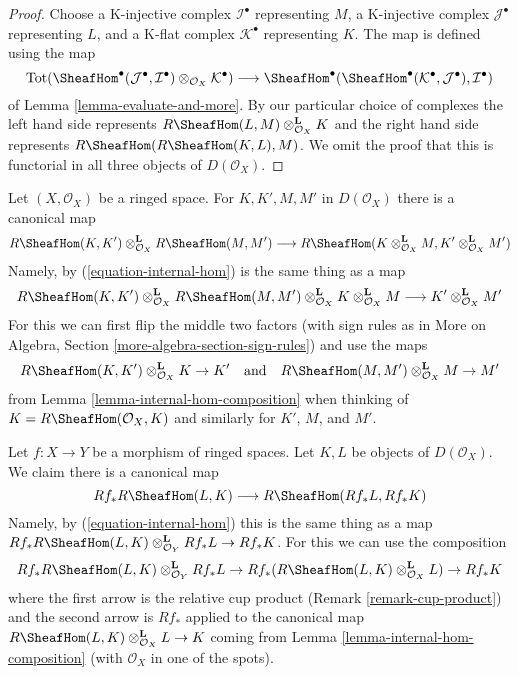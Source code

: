 \begin{proof}
Choose
a K-injective complex $\mathcal{I}^\bullet$ representing $M$,
a K-injective complex $\mathcal{J}^\bullet$ representing $L$, and
a K-flat complex $\mathcal{K}^\bullet$ representing $K$.
The map is defined using the map
$$
\text{Tot}(\SheafHom^\bullet(\mathcal{J}^\bullet,
\mathcal{I}^\bullet) \otimes_{\mathcal{O}_X} \mathcal{K}^\bullet)
\longrightarrow
\SheafHom^\bullet(\SheafHom^\bullet(\mathcal{K}^\bullet,
\mathcal{J}^\bullet), \mathcal{I}^\bullet)
$$
of Lemma \ref{lemma-evaluate-and-more}. By our particular
choice of complexes the left hand side represents
$R\SheafHom(L, M) \otimes_{\mathcal{O}_X}^\mathbf{L} K$
and the right hand side represents
$R\SheafHom(R\SheafHom(K, L), M)$. We omit the proof that
this is functorial in all three objects of $D(\mathcal{O}_X)$.
\end{proof}

\begin{remark}
\label{remark-tensor-internal-hom}
Let $(X, \mathcal{O}_X)$ be a ringed space. For $K, K', M, M'$ in
$D(\mathcal{O}_X)$ there is a canonical map
$$
R\SheafHom(K, K') \otimes_{\mathcal{O}_X}^\mathbf{L}
R\SheafHom(M, M')
\longrightarrow
R\SheafHom(K \otimes_{\mathcal{O}_X}^\mathbf{L} M,
K' \otimes_{\mathcal{O}_X}^\mathbf{L} M')
$$
Namely, by (\ref{equation-internal-hom}) is the same thing as a map
$$
R\SheafHom(K, K') \otimes_{\mathcal{O}_X}^\mathbf{L}
R\SheafHom(M, M') \otimes_{\mathcal{O}_X}^\mathbf{L}
K \otimes_{\mathcal{O}_X}^\mathbf{L} M
\longrightarrow
K' \otimes_{\mathcal{O}_X}^\mathbf{L} M'
$$
For this we can first flip the middle two factors
(with sign rules as in More on Algebra, Section
\ref{more-algebra-section-sign-rules})
and use the maps
$$
R\SheafHom(K, K') \otimes_{\mathcal{O}_X}^\mathbf{L} K \to K'
\quad\text{and}\quad
R\SheafHom(M, M') \otimes_{\mathcal{O}_X}^\mathbf{L} M \to M'
$$
from Lemma \ref{lemma-internal-hom-composition} when thinking
of $K = R\SheafHom(\mathcal{O}_X, K)$ and similarly for
$K'$, $M$, and $M'$.
\end{remark}

\begin{remark}
\label{remark-projection-formula-for-internal-hom}
Let $f : X \to Y$ be a morphism of ringed spaces.
Let $K, L$ be objects of $D(\mathcal{O}_X)$. We claim there is a canonical map
$$
Rf_*R\SheafHom(L, K) \longrightarrow R\SheafHom(Rf_*L, Rf_*K)
$$
Namely, by (\ref{equation-internal-hom}) this is the same thing
as a map
$Rf_*R\SheafHom(L, K) \otimes_{\mathcal{O}_Y}^\mathbf{L} Rf_*L \to Rf_*K$.
For this we can use the composition
$$
Rf_*R\SheafHom(L, K) \otimes_{\mathcal{O}_Y}^\mathbf{L} Rf_*L \to
Rf_*(R\SheafHom(L, K) \otimes_{\mathcal{O}_X}^\mathbf{L} L) \to
Rf_*K
$$
where the first arrow is the relative cup product
(Remark \ref{remark-cup-product}) and the second arrow is $Rf_*$ applied
to the canonical map
$R\SheafHom(L, K) \otimes_{\mathcal{O}_X}^\mathbf{L} L \to K$
coming from Lemma \ref{lemma-internal-hom-composition}
(with $\mathcal{O}_X$ in one of the spots).
\end{remark}


